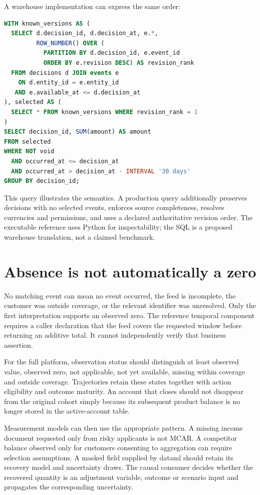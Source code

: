 A warehouse implementation can express the same order:
\begin{lstlisting}[language=SQL]
WITH known_versions AS (
  SELECT d.decision_id, d.decision_at, e.*,
         ROW_NUMBER() OVER (
           PARTITION BY d.decision_id, e.event_id
           ORDER BY e.revision DESC) AS revision_rank
  FROM decisions d JOIN events e
    ON d.entity_id = e.entity_id
   AND e.available_at <= d.decision_at
), selected AS (
  SELECT * FROM known_versions WHERE revision_rank = 1
)
SELECT decision_id, SUM(amount) AS amount
FROM selected
WHERE NOT void
  AND occurred_at <= decision_at
  AND occurred_at > decision_at - INTERVAL '30 days'
GROUP BY decision_id;
\end{lstlisting}
This query illustrates the semantics. A production query additionally
preserves decisions with no selected events, enforces source completeness,
resolves currencies and permissions, and uses a declared authoritative
revision order. The executable reference uses Python for inspectability;
the SQL is a proposed warehouse translation, not a claimed benchmark.

\section{Absence is not automatically a zero}
No matching event can mean no event occurred, the feed is incomplete,
the customer was outside coverage, or the relevant identifier was unresolved.
Only the first interpretation supports an observed zero. The reference
temporal component requires a caller declaration that the feed covers the
requested window before returning an additive total. It cannot independently
verify that business assertion.

For the full platform, observation status should distinguish at least
observed value, observed zero, not applicable, not yet available,
missing within coverage and outside coverage. Trajectories retain these
states together with action eligibility and outcome maturity. An account
that closes should not disappear from the original cohort simply because
its subsequent product balance is no longer stored in the active-account
table.

Measurement models can then use the appropriate pattern. A missing income
document requested only from risky applicants is not MCAR. A competitor
balance observed only for customers consenting to aggregation can require
selection assumptions. A masked field supplied by dataml should retain
its recovery model and uncertainty draws. The causal consumer decides
whether the recovered quantity is an adjustment variable, outcome or
scenario input and propagates the corresponding uncertainty.

